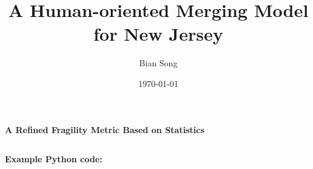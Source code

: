 \documentclass[notitlepage]{mcmthesis}
\title{
    A Human-oriented Merging Model for New Jersey}
\author{Bian Song}
\date{\today}
\theoremstyle{definition}
\begin{document}
    
    
    
    
    \maketitle
    
    
    \begin{center}
        \textbf{\LARGE{A Refined Fragility Metric Based on Statistics}}
    \end{center}
    
    \setcounter{page}{1}













\newpage
\begin{appendices}
\section{}
\noindent
\textbf{\textcolor[rgb]{0.98,0.00,0.00}{Example Python code: }}

\end{appendices}
\end{document}
